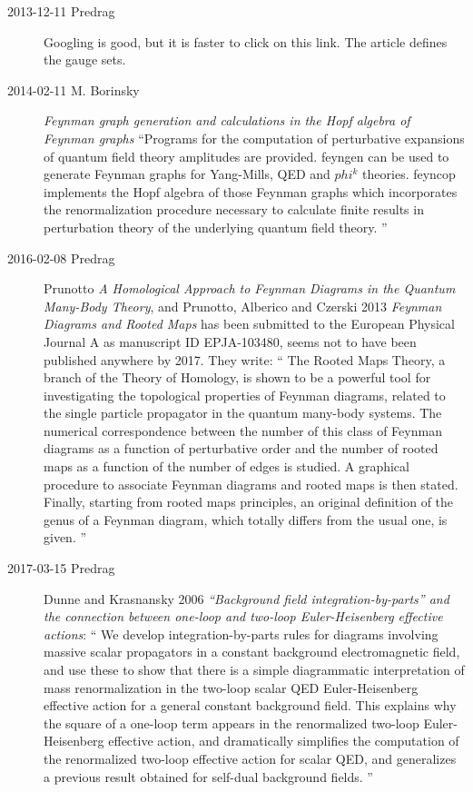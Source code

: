 \begin{description}
\item[2013-12-11  Predrag]
Googling is good, but it is faster to click on
{this link}. The article defines the gauge sets.

\item[2014-02-11 M. Borinsky]
\emph{Feynman graph generation and calculations in the Hopf algebra of
Feynman graphs}
``Programs for the computation of perturbative expansions of quantum
field theory amplitudes are provided. feyngen can be used to generate
Feynman graphs for Yang-Mills, QED and $phi^k$ theories. feyncop
implements the Hopf algebra of those Feynman graphs which incorporates
the renormalization procedure necessary to calculate finite results in
perturbation theory of the underlying quantum field theory. ''

\item[2016-02-08  Predrag]
Prunotto
{\em A Homological Approach to Feynman Diagrams in the Quantum Many-Body Theory},
and
Prunotto, Alberico and Czerski 2013
{\em Feynman Diagrams and Rooted Maps}
has been submitted to the European Physical Journal A as manuscript ID EPJA-103480,
seems not to have been published anywhere by 2017.
They write: ``
The  Rooted Maps Theory, a branch of the Theory of Homology, is shown to be
a powerful tool for investigating  the topological properties of Feynman
diagrams, related to the single particle propagator in the quantum many-body
systems. The numerical correspondence between the number of this class of
Feynman diagrams as a function of perturbative order and the number of rooted
maps as a function of the number of edges is studied. A graphical procedure to
associate Feynman diagrams and rooted maps is then stated. Finally, starting
from rooted maps principles, an original definition of the genus of a
Feynman diagram, which totally differs from the usual one, is given.
''

\item[2017-03-15 Predrag]
Dunne and Krasnansky 2006 {\em ``Background field
integration-by-parts'' and the connection between one-loop and two-loop
{Euler-Heisenberg} effective actions}: ``
We develop integration-by-parts rules for diagrams involving massive
scalar propagators in a constant background electromagnetic field, and
use these to show that there is a simple diagrammatic interpretation of
mass renormalization in the two-loop scalar QED Euler-Heisenberg
effective action for a general constant background field. This explains
why the square of a one-loop term appears in the renormalized two-loop
Euler-Heisenberg effective action, and
dramatically simplifies the computation of the renormalized two-loop
effective action for scalar QED, and generalizes a previous result
obtained for self-dual background fields.
''


\end{description}
